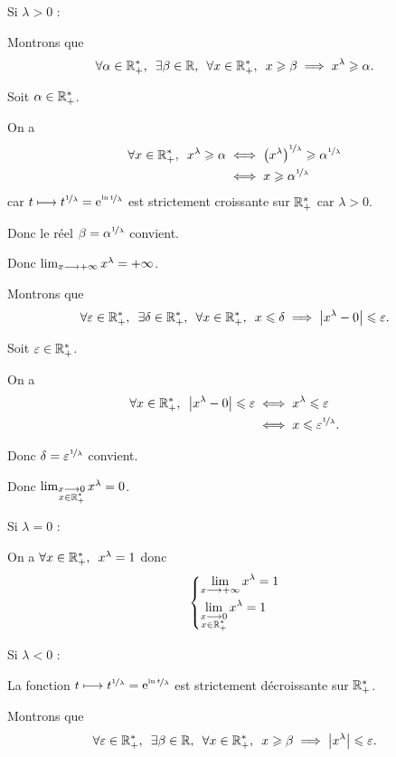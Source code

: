 \begin{dem}
Si \(\lambda>0\) :

Montrons que \[\quantifs{\forall\alpha\in\Rps;\exists\beta\in\R;\forall x\in\Rps}x\geq\beta\imp x^\lambda\geq\alpha.\]

Soit \(\alpha\in\Rps\).

On a \[\begin{aligned}
\quantifs{\forall x\in\Rps}x^\lambda\geq\alpha&\ssi\paren{x^\lambda}^{\nicefrac{1}{\lambda}}\geq\alpha^{\nicefrac{1}{\lambda}} \\
&\ssi x\geq\alpha^{\nicefrac{1}{\lambda}}
\end{aligned}\] car \(t\mapsto t^{\nicefrac{1}{\lambda}}=\e{\nicefrac{\ln t}{\lambda}}\) est strictement croissante sur \(\Rps\) car \(\lambda>0\).

Donc le réel \(\beta=\alpha^{\nicefrac{1}{\lambda}}\) convient.

Donc \(\lim_{x\to\pinf}x^\lambda=\pinf\).

Montrons que \[\quantifs{\forall\epsilon\in\Rps;\exists\delta\in\Rps;\forall x\in\Rps}x\leq\delta\imp\abs{x^\lambda-0}\leq\epsilon.\]

Soit \(\epsilon\in\Rps\).

On a \[\begin{aligned}
\quantifs{\forall x\in\Rps}\abs{x^\lambda-0}\leq\epsilon&\ssi x^\lambda\leq\epsilon \\
&\ssi x\leq\epsilon^{\nicefrac{1}{\lambda}}.
\end{aligned}\]

Donc \(\delta=\epsilon^{\nicefrac{1}{\lambda}}\) convient.

Donc \(\lim_{\substack{x\to0 \\ x\in\Rps}}x^\lambda=0\).

Si \(\lambda=0\) :

On a \(\quantifs{\forall x\in\Rps}x^\lambda=1\) donc \[\begin{dcases}\lim_{x\to\pinf}x^\lambda=1 \\ \lim_{\substack{x\to0 \\ x\in\Rps}}x^\lambda=1\end{dcases}\]

Si \(\lambda<0\) :

La fonction \(t\mapsto t^{\nicefrac{1}{\lambda}}=\e{\nicefrac{\ln t}{\lambda}}\) est strictement décroissante sur \(\Rps\).

Montrons que \[\quantifs{\forall\epsilon\in\Rps;\exists\beta\in\R;\forall x\in\Rps}x\geq\beta\imp\abs{x^\lambda}\leq\epsilon.\]


\end{dem}
